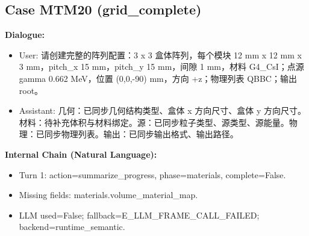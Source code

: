 \documentclass[11pt]{ctexart}
\begin{document}
\subsection{Case MTM20 (grid\_complete)}
\textbf{Dialogue:}
\begin{itemize}
\item User: 请创建完整的阵列配置：3 x 3 盒体阵列，每个模块 12 mm x 12 mm x 3 mm，pitch\_x 15 mm，pitch\_y 15 mm，间隙 1 mm，材料 G4\_CsI；点源 gamma 0.662 MeV，位置 (0,0,-90) mm，方向 +z；物理列表 QBBC；输出 root。
\item Assistant: 几何：已同步几何结构类型、盒体 x 方向尺寸、盒体 y 方向尺寸。材料：待补充体积与材料绑定。源：已同步粒子类型、源类型、源能量。物理：已同步物理列表。输出：已同步输出格式、输出路径。
\end{itemize}
\textbf{Internal Chain (Natural Language):}
\begin{itemize}
\item Turn 1: action=summarize\_progress, phase=materials, complete=False.
\item Missing fields: materials.volume\_material\_map.
\item LLM used=False; fallback=E\_LLM\_FRAME\_CALL\_FAILED; backend=runtime\_semantic.
\end{itemize}
\end{document}
